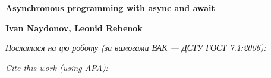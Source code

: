 \documentclass[a4paper,14pt,article]{memoir}
\newcommand{\articleTitleEng}{
	Asynchronous programming with async and await}
\renewcommand{\authorFullNameEng}{Ivan Naydonov, Leonid Rebenok}
\begin{document}
	
	\begin{center}
		\par\textbf{\MakeUppercase\articleTitleEng}
		\par\textbf{\authorFullNameEng}
	\end{center}
	
	\par\bigskip\textit{Послатися на цю роботу (за вимогами ВАК --- ДСТУ ГОСТ 7.1:2006):}
	\par{}
	\par\bigskip\textit{Cite this work (using APA):}
	\par{}
	
	
\end{document}
